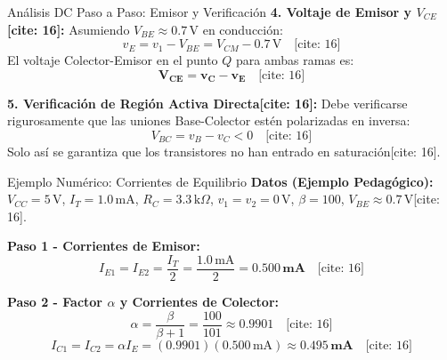 \documentclass[aspectratio=169]{beamer}
\begin{document}
\begin{frame}{Análisis DC Paso a Paso: Emisor y Verificación}
    \textbf{4. Voltaje de Emisor y $V_{CE}$[cite: 16]:}
    Asumiendo $V_{BE} \approx 0.7\,\text{V}$ en conducción:
    \begin{equation*}
        v_E = v_1 - V_{BE} = V_{CM} - 0.7\,\text{V} \quad \text{[cite: 16]}
    \end{equation*}
    El voltaje Colector-Emisor en el punto $Q$ para ambas ramas es:
    \begin{equation*}
        \mathbf{V_{CE} = v_C - v_E} \quad \text{[cite: 16]}
    \end{equation*}
    
    \vspace{0.3cm}
    \textbf{5. Verificación de Región Activa Directa[cite: 16]:}
    Debe verificarse rigurosamente que las uniones Base-Colector estén polarizadas en inversa:
    \begin{equation*}
        V_{BC} = v_B - v_C < 0 \quad \text{[cite: 16]}
    \end{equation*}
    Solo así se garantiza que los transistores no han entrado en saturación[cite: 16].
\end{frame}

\begin{frame}{Ejemplo Numérico: Corrientes de Equilibrio}
    \textbf{Datos (Ejemplo Pedagógico):} $V_{CC}=5\,\text{V}$, $I_T=1.0\,\text{mA}$, $R_C=3.3\,\text{k}\Omega$, $v_1=v_2=0\,\text{V}$, $\beta=100$, $V_{BE}\approx0.7\,\text{V}$[cite: 16].
    
    \vspace{0.3cm}
    \textbf{Paso 1 - Corrientes de Emisor:}
    \begin{equation*}
        I_{E1} = I_{E2} = \frac{I_T}{2} = \frac{1.0\,\text{mA}}{2} = \mathbf{0.500\,\text{mA}} \quad \text{[cite: 16]}
    \end{equation*}
    
    \vspace{0.3cm}
    \textbf{Paso 2 - Factor $\alpha$ y Corrientes de Colector:}
    \begin{equation*}
        \alpha = \frac{\beta}{\beta+1} = \frac{100}{101} \approx \mathbf{0.9901} \quad \text{[cite: 16]}
    \end{equation*}
    \begin{equation*}
        I_{C1} = I_{C2} = \alpha I_E = (0.9901)(0.500\,\text{mA}) \approx \mathbf{0.495\,\text{mA}} \quad \text{[cite: 16]}
    \end{equation*}
\end{frame}
\end{document}
